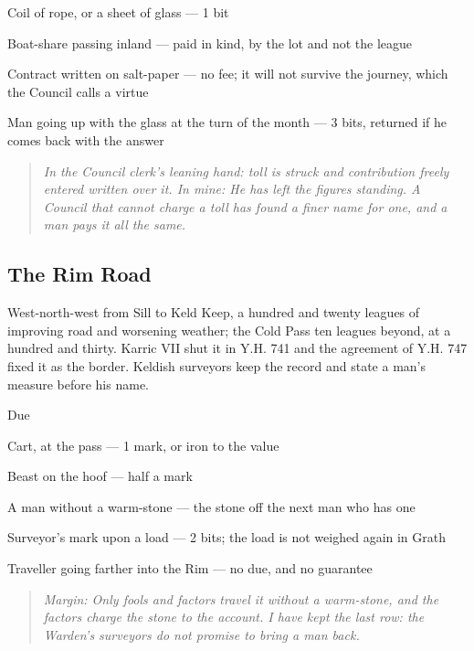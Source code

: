 \documentclass{design/chronicle}
\begin{document}
Coil of rope, or a sheet of glass — 1 bit\par

Boat-share passing inland — paid in kind, by the lot and not the league\par

Contract written on salt-paper — no fee; it will not survive the journey, which the Council calls a virtue\par

Man going up with the glass at the turn of the month — 3 bits, returned if he comes back with the answer\par

\begin{quote}\itshape \emph{In the Council clerk’s leaning hand:} \emph{toll} is struck and \emph{contribution freely entered} written over it. \emph{In mine:} He has left the figures standing. A Council that cannot charge a toll has found a finer name for one, and a man pays it all the same.\end{quote}

\subsection*{The Rim Road}

West-north-west from Sill to Keld Keep, a hundred and twenty leagues of improving road and worsening weather; the Cold Pass ten leagues beyond, at a hundred and thirty. Karric VII shut it in Y.H. 741 and the agreement of Y.H. 747 fixed it as the border. Keldish surveyors keep the record and state a man’s measure before his name.

Due\par

Cart, at the pass — 1 mark, or iron to the value\par

Beast on the hoof — half a mark\par

A man without a warm-stone — the stone off the next man who has one\par

Surveyor’s mark upon a load — 2 bits; the load is not weighed again in Grath\par

Traveller going farther into the Rim — no due, and no guarantee\par

\begin{quote}\itshape \emph{Margin:} Only fools and factors travel it without a warm-stone, and the factors charge the stone to the account. I have kept the last row: the Warden’s surveyors do not promise to bring a man back.\end{quote}
\end{document}
